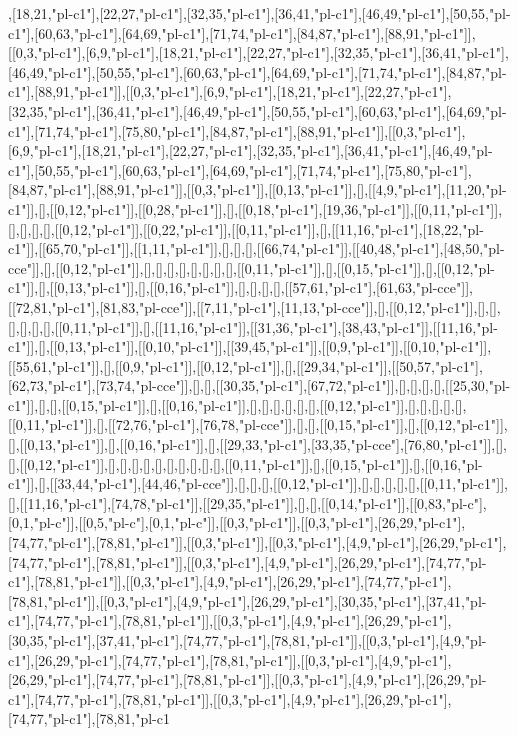 ,[18,21,"pl-c1"],[22,27,"pl-c1"],[32,35,"pl-c1"],[36,41,"pl-c1"],[46,49,"pl-c1"],[50,55,"pl-c1"],[60,63,"pl-c1"],[64,69,"pl-c1"],[71,74,"pl-c1"],[84,87,"pl-c1"],[88,91,"pl-c1"]],[[0,3,"pl-c1"],[6,9,"pl-c1"],[18,21,"pl-c1"],[22,27,"pl-c1"],[32,35,"pl-c1"],[36,41,"pl-c1"],[46,49,"pl-c1"],[50,55,"pl-c1"],[60,63,"pl-c1"],[64,69,"pl-c1"],[71,74,"pl-c1"],[84,87,"pl-c1"],[88,91,"pl-c1"]],[[0,3,"pl-c1"],[6,9,"pl-c1"],[18,21,"pl-c1"],[22,27,"pl-c1"],[32,35,"pl-c1"],[36,41,"pl-c1"],[46,49,"pl-c1"],[50,55,"pl-c1"],[60,63,"pl-c1"],[64,69,"pl-c1"],[71,74,"pl-c1"],[75,80,"pl-c1"],[84,87,"pl-c1"],[88,91,"pl-c1"]],[[0,3,"pl-c1"],[6,9,"pl-c1"],[18,21,"pl-c1"],[22,27,"pl-c1"],[32,35,"pl-c1"],[36,41,"pl-c1"],[46,49,"pl-c1"],[50,55,"pl-c1"],[60,63,"pl-c1"],[64,69,"pl-c1"],[71,74,"pl-c1"],[75,80,"pl-c1"],[84,87,"pl-c1"],[88,91,"pl-c1"]],[[0,3,"pl-c1"]],[[0,13,"pl-c1"]],[],[[4,9,"pl-c1"],[11,20,"pl-c1"]],[],[[0,12,"pl-c1"]],[[0,28,"pl-c1"]],[],[[0,18,"pl-c1"],[19,36,"pl-c1"]],[[0,11,"pl-c1"]],[],[],[],[],[[0,12,"pl-c1"]],[[0,22,"pl-c1"]],[[0,11,"pl-c1"]],[],[[11,16,"pl-c1"],[18,22,"pl-c1"]],[[65,70,"pl-c1"]],[[1,11,"pl-c1"]],[],[],[],[[66,74,"pl-c1"]],[[40,48,"pl-c1"],[48,50,"pl-cce"]],[],[[0,12,"pl-c1"]],[],[],[],[],[],[],[],[],[[0,11,"pl-c1"]],[],[[0,15,"pl-c1"]],[],[[0,12,"pl-c1"]],[],[[0,13,"pl-c1"]],[],[[0,16,"pl-c1"]],[],[],[],[],[[57,61,"pl-c1"],[61,63,"pl-cce"]],[[72,81,"pl-c1"],[81,83,"pl-cce"]],[[7,11,"pl-c1"],[11,13,"pl-cce"]],[],[[0,12,"pl-c1"]],[],[],[],[],[],[],[[0,11,"pl-c1"]],[],[[11,16,"pl-c1"]],[[31,36,"pl-c1"],[38,43,"pl-c1"]],[[11,16,"pl-c1"]],[],[[0,13,"pl-c1"]],[[0,10,"pl-c1"]],[[39,45,"pl-c1"]],[[0,9,"pl-c1"]],[[0,10,"pl-c1"]],[[55,61,"pl-c1"]],[],[[0,9,"pl-c1"]],[[0,12,"pl-c1"]],[],[[29,34,"pl-c1"]],[[50,57,"pl-c1"],[62,73,"pl-c1"],[73,74,"pl-cce"]],[],[],[[30,35,"pl-c1"],[67,72,"pl-c1"]],[],[],[],[],[[25,30,"pl-c1"]],[],[],[[0,15,"pl-c1"]],[],[[0,16,"pl-c1"]],[],[],[],[],[],[],[[0,12,"pl-c1"]],[],[],[],[],[],[[0,11,"pl-c1"]],[],[[72,76,"pl-c1"],[76,78,"pl-cce"]],[],[],[[0,15,"pl-c1"]],[],[[0,12,"pl-c1"]],[],[[0,13,"pl-c1"]],[],[[0,16,"pl-c1"]],[],[[29,33,"pl-c1"],[33,35,"pl-cce"],[76,80,"pl-c1"]],[],[],[[0,12,"pl-c1"]],[],[],[],[],[],[],[],[],[],[],[[0,11,"pl-c1"]],[],[[0,15,"pl-c1"]],[],[[0,16,"pl-c1"]],[],[[33,44,"pl-c1"],[44,46,"pl-cce"]],[],[],[],[[0,12,"pl-c1"]],[],[],[],[],[],[[0,11,"pl-c1"]],[],[[11,16,"pl-c1"],[74,78,"pl-c1"]],[[29,35,"pl-c1"]],[],[],[[0,14,"pl-c1"]],[[0,83,"pl-c"],[0,1,"pl-c"]],[[0,5,"pl-c"],[0,1,"pl-c"]],[[0,3,"pl-c1"]],[[0,3,"pl-c1"],[26,29,"pl-c1"],[74,77,"pl-c1"],[78,81,"pl-c1"]],[[0,3,"pl-c1"]],[[0,3,"pl-c1"],[4,9,"pl-c1"],[26,29,"pl-c1"],[74,77,"pl-c1"],[78,81,"pl-c1"]],[[0,3,"pl-c1"],[4,9,"pl-c1"],[26,29,"pl-c1"],[74,77,"pl-c1"],[78,81,"pl-c1"]],[[0,3,"pl-c1"],[4,9,"pl-c1"],[26,29,"pl-c1"],[74,77,"pl-c1"],[78,81,"pl-c1"]],[[0,3,"pl-c1"],[4,9,"pl-c1"],[26,29,"pl-c1"],[30,35,"pl-c1"],[37,41,"pl-c1"],[74,77,"pl-c1"],[78,81,"pl-c1"]],[[0,3,"pl-c1"],[4,9,"pl-c1"],[26,29,"pl-c1"],[30,35,"pl-c1"],[37,41,"pl-c1"],[74,77,"pl-c1"],[78,81,"pl-c1"]],[[0,3,"pl-c1"],[4,9,"pl-c1"],[26,29,"pl-c1"],[74,77,"pl-c1"],[78,81,"pl-c1"]],[[0,3,"pl-c1"],[4,9,"pl-c1"],[26,29,"pl-c1"],[74,77,"pl-c1"],[78,81,"pl-c1"]],[[0,3,"pl-c1"],[4,9,"pl-c1"],[26,29,"pl-c1"],[74,77,"pl-c1"],[78,81,"pl-c1"]],[[0,3,"pl-c1"],[4,9,"pl-c1"],[26,29,"pl-c1"],[74,77,"pl-c1"],[78,81,"pl-c1